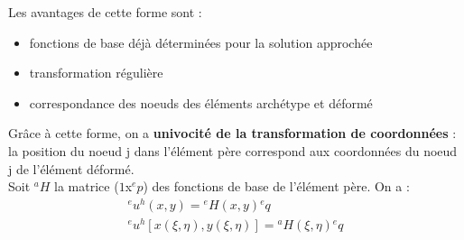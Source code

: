 \documentclass[../main.tex]{subfiles}
\begin{document}
Les avantages de cette forme sont : \begin{itemize}
    \item fonctions de base déjà déterminées pour la solution approchée\\
    \item transformation régulière\\
    \item correspondance des noeuds des éléments archétype et déformé\\
\end{itemize}

Grâce à cette forme, on a \textbf{univocité de la transformation de coordonnées} : la position du noeud j dans l'élément père correspond aux coordonnées du noeud j de l'élément déformé.\\

Soit ${}^aH$ la matrice ($1$x${}^ep$) des fonctions de base de l'élément père. On a : \begin{equation}
    \begin{gathered}
        {}^eu^h(x,y) = {}^eH(x,y) {}^eq\\
        {}^e u^h[x(\xi, \eta), y(\xi, \eta)] = {}^aH(\xi, \eta) {}^eq\\
    \end{gathered}
\end{equation}
\end{document}
